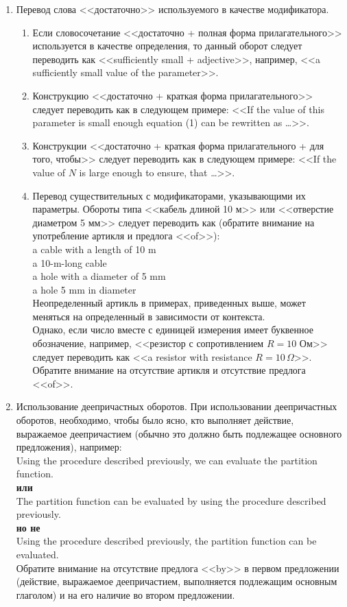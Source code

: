 \documentclass[a5paper, 10pt, twoside, numbers=enddot]{scrartcl}
\begin{document}
\begin{enumerate}
  \item Перевод слова <<достаточно>> используемого в качестве модификатора.
  \begin{enumerate}   
    \item Если словосочетание <<достаточно + полная форма прилагательного>> используется в качестве определения, то данный оборот следует переводить как <<sufficiently small + adjective>>, например, <<a sufficiently small value of the parameter>>.
    
    \item Конструкцию <<достаточно + краткая форма прилагательного>> следует переводить как в следующем примере: <<If the value of this parameter is small enough equation (1) can be rewritten as \ldots>>.
    
    \item Конструкции <<достаточно + краткая форма прилагательного + для того, чтобы>> следует переводить как в следующем примере: <<If the value of $N$ is large enough to ensure, that \ldots>>.
    
    \item Перевод существительных с модификаторами, указывающими их параметры. Обороты типа <<кабель длиной 10 м>> или <<отверстие диаметром 5 мм>> следует переводить как (обратите внимание на употребление артикля и предлога <<of>>):\\ [4pt] \textsf{
    a cable with a length of 10 m\\
    a 10-m-long cable\\
    a hole with a diameter of 5 mm\\
    a hole 5 mm in diameter\\ [4pt]}
    Неопределенный артикль в примерах, приведенных выше, может меняться на определенный в зависимости от контекста.\\ [4pt]
    Однако, если число вместе с единицей измерения имеет буквенное обозначение, например, <<резистор с сопротивлением $R = 10$ Ом>> следует переводить как <<a resistor with resistance $R = 10\,\Omega$>>. Обратите внимание на отсутствие артикля и отсутствие предлога <<of>>.
  \end{enumerate}
    
  \item Использование деепричастных оборотов. При использовании  деепричастных оборотов, необходимо, чтобы было ясно, кто выполняет действие, выражаемое деепричастием (обычно это должно быть подлежащее основного предложения), например:\\ [4pt] \textsf{
  Using the procedure described previously, we can evaluate the partition function.\\ [4pt]
  \textbf{или}\\ [4pt]
  The partition function can be evaluated by using the procedure described previously.\\ [4pt]
  \textbf{но не}\\ [4pt]
  Using the procedure described previously, the partition function can be evaluated.\\ [4pt]}
  Обратите внимание на отсутствие предлога <<by>> в первом предложении (действие, выражаемое деепричастием, выполняется подлежащим основным глаголом) и на его наличие во втором предложении.
  

\end{enumerate}
\end{document}
